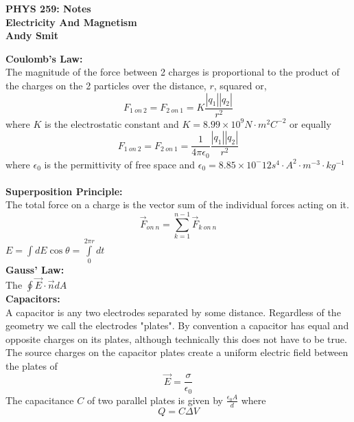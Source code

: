 \documentclass[14pt]{article}
\begin{document}
    \begin{center}
        \textbf{PHYS 259: Notes\\Electricity And Magnetism\\Andy Smit}
    \end{center}
    \textbf{Coulomb's Law:}\\
    The magnitude of the force between 2 charges is proportional to the
    product of the charges on the 2 particles over the distance, $r$,
    squared or,  $$F_{1\ on\ 2}=F_{2\ on\ 1}=K
    \frac{|q_1||q_2|}{r^2}$$where $K$ is the electrostatic constant and
    $K=8.99\times 10^9 N\cdot m^2 C^{-2}$ or equally $$F_{1\ on\ 2}=F_{2\
    on\ 1}=\frac{1}{4\pi\epsilon_0}\frac{|q_1||q_2|}{r^2}$$ 
    where $\epsilon_0$ is the permittivity of free space and
    $\epsilon_0=8.85\times10^-12 s^4\cdot A^2\cdot m^{-3}\cdot
    kg^{-1}$\\\\
    \textbf{Superposition Principle:}\\
    The total force on a charge is the vector sum of the individual
    forces acting on it. $$\vec{F}_{on\
    n}=\sum\limits_{k=1}^{n-1}\vec{F}_{k\ on\ n}$$ $E=\int
    dE\cos\theta=\int\limits_0^{2\pi r}dt$\\
    \textbf{Gauss' Law:}\\
    The $\oint\vec{E} \cdot\vec{n}dA$\\
    \textbf{Capacitors: }\\
    A capacitor is any two electrodes separated by some distance.
    Regardless of the geometry we call the electrodes "plates". By
    convention a capacitor has equal and opposite charges on its plates,
    although technically this does not have to be true. The source
    charges on the capacitor plates create a uniform electric field
    between the plates of 
    $$\vec E=\frac{\sigma}{\epsilon_0}$$ The capacitance $C$ of two
    parallel plates is given by $\frac{\epsilon_0A}{d}$ where
    $$Q=C\Delta V$$
\end{document}
